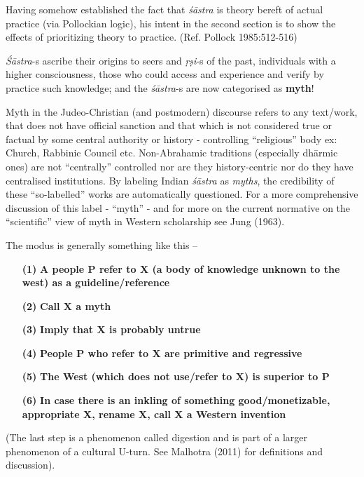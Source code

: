 Having somehow established the fact that {\sl śāstra} is theory bereft of actual practice (via Pollockian logic), his intent in the second section is to show the effects of prioritizing theory to practice. (Ref. Pollock 1985:512-516)

{\sl Śāstra}-s ascribe their origins to seers and {\sl ṛṣi}-s of the past, individuals with a higher consciousness, those who could access and experience and verify by practice such knowledge; and the {\sl śāstra}-s are now categorised as {\bf myth}!

Myth in the Judeo-Christian (and postmodern) discourse refers to any text/work, that does not have official sanction and that which is not considered true or factual by some central authority or history - controlling ``religious'' body ex: Church, Rabbinic Council etc. Non-Abrahamic traditions (especially dhārmic ones) are not ``centrally'' controlled nor are they history-centric nor do they have centralised institutions. By labeling Indian {\sl śāstra} as {\sl myths}, the credibility of these ``so-labelled'' works are automatically questioned. For a more comprehensive discussion of this label -  ``myth'' - and for more on the current normative on the ``scientific'' view of myth in Western scholarship see Jung (1963).

The modus is generally something like this --
\begin{itemize}
\item[{\bf(1)}] {\bf A people P refer to X (a body of knowledge unknown to the west) as a guideline/reference}

\item[{\bf(2)}] {\bf Call X  a myth} 

\item[{\bf(3)}] {\bf Imply that X is probably untrue}

\item[{\bf(4)}] {\bf People P who refer to X are primitive and regressive}

\item[{\bf(5)}] {\bf The West (which does not use/refer to X) is superior to P}

\item[{\bf(6)}] {\bf In case there is an inkling of something good/monetizable, appropriate X, rename X, call X a Western invention} 
\end{itemize}

(The last step is a phenomenon called digestion and is part of a larger phenomenon of a cultural U-turn. See Malhotra (2011) for definitions and discussion).

